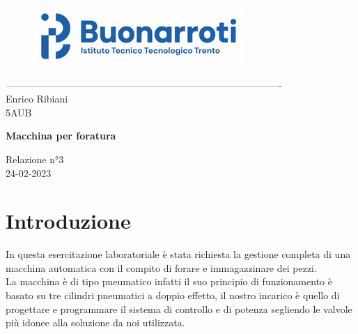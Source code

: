 \documentclass[12pt]{article}
\begin{document}
\begin{titlepage}
	\begin{center}
		\begin{figure}
			\centering
			\includegraphics[scale=1.2]{logo.png}
			\label{fig:logo}
		\end{figure}
		-------------------------------------------------------------------------------------\\
		\vspace{2\baselineskip}
		\large Enrico Ribiani\\
		\large 5AUB\\
		\vfill

		\Huge{\textbf{Macchina per foratura}}\\
		\vfill

		\LARGE{Relazione n°3}\\
		\vfill
		\large{24-02-2023}
	\end{center}
\end{titlepage}
\tableofcontents
\newpage
\section{Introduzione}
In questa esercitazione laboratoriale è stata richiesta la gestione completa di una macchina automatica con il compito di forare e immagazzinare dei pezzi.\\
La macchina è di tipo pneumatico infatti il suo principio di funzionamento è basato su tre cilindri pneumatici a doppio effetto, il nostro incarico è quello di progettare e programmare il sistema di controllo e di potenza segliendo le valvole più idonee alla soluzione da noi utilizzata.
\end{document}
